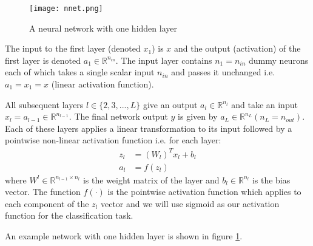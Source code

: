 \begin{figure}[ht]
\begin{center}
\centerline{\texttt{[image: nnet.png]}}
\caption{A neural network with one hidden layer}
\label{fig:nnet}
\end{center}
\vskip -0.2in
\end{figure}

The input to the first layer (denoted $x_1$) is $x$ and the output (activation) of the first layer is denoted $a_1 \in \mathbb{R}^{n_{in}}$. The input layer contains $n_1 = n_{in}$ dummy neurons each of which takes a single scalar input $n_{in}$ and passes it unchanged i.e. $a_1 = x_1 = x$ (linear activation function).

All subsequent layers $l \in \{2,3,...,L\}$ give an output $a_l \in \mathbb{R}^{n_{l}}$ and take an input $x_l = a_{l-1} \in \mathbb{R}^{n_{l-1}}$. The final network output $y$ is given by $a_L \in \mathbb{R}^{n_L} (n_L = n_{out})$.
Each of these layers applies a linear transformation to its input followed by a pointwise non-linear activation function i.e. for each layer:
\begin{align}
z_l &= (W_l)^T x_l + b_l \\
a_l &= f(z_l)
\end{align}
where $W^l \in \mathbb{R}^{n_{l-1} \times n_l}$ is the weight matrix of the layer and $b_l \in \mathbb{R}^{n_l}$ is the bias vector. The function $f(\cdot)$ is the pointwise activation function which applies to each component of the $z_l$ vector and we will use sigmoid as our activation function for the classification task.

An example network with one hidden layer is shown in figure \ref{fig:nnet}.
